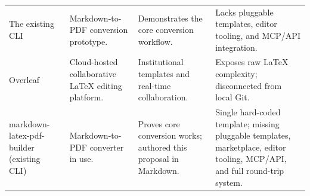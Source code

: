 \begin{xltabular}{\textwidth}{@{}p{0.20\textwidth}X X X@{}}
The existing CLI~\cite{ref7} & Markdown-to-PDF conversion prototype. & Demonstrates the core conversion workflow. & Lacks pluggable templates, editor tooling, and MCP/API integration. \\
Overleaf~\cite{overleaf2024} & Cloud-hosted collaborative LaTeX editing platform. & Institutional templates and real-time collaboration. & Exposes raw LaTeX complexity; disconnected from local Git. \\
markdown-latex-pdf-builder (existing CLI)~\cite{ref7} & Markdown-to-PDF converter in use. & Proves core conversion works; authored this proposal in Markdown. & Single hard-coded template; missing pluggable templates, marketplace, editor tooling, MCP/API, and full round-trip system. \\
\end{xltabular}


